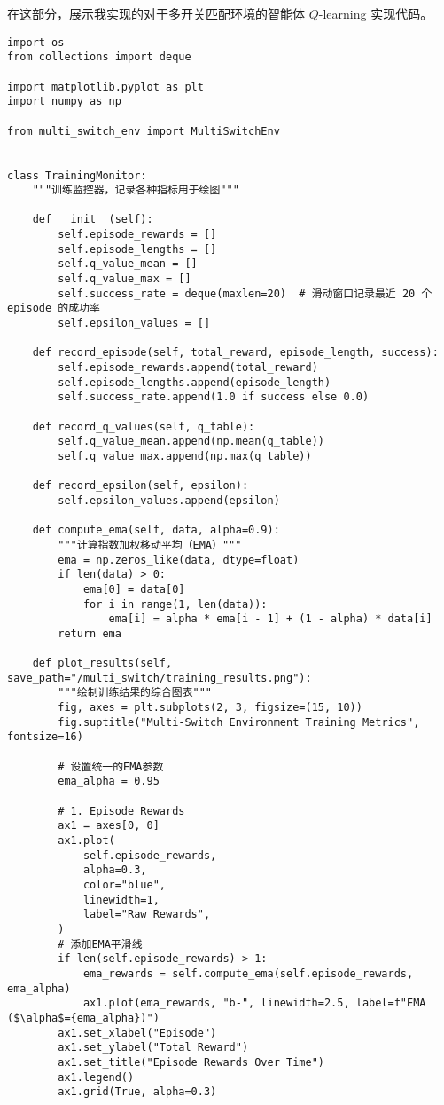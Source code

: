 在这部分，展示我实现的对于多开关匹配环境的智能体 \(Q\)-learning 实现代码。

\begin{verbatim}
import os
from collections import deque

import matplotlib.pyplot as plt
import numpy as np

from multi_switch_env import MultiSwitchEnv


class TrainingMonitor:
    """训练监控器，记录各种指标用于绘图"""

    def __init__(self):
        self.episode_rewards = []
        self.episode_lengths = []
        self.q_value_mean = []
        self.q_value_max = []
        self.success_rate = deque(maxlen=20)  # 滑动窗口记录最近 20 个 episode 的成功率
        self.epsilon_values = []

    def record_episode(self, total_reward, episode_length, success):
        self.episode_rewards.append(total_reward)
        self.episode_lengths.append(episode_length)
        self.success_rate.append(1.0 if success else 0.0)

    def record_q_values(self, q_table):
        self.q_value_mean.append(np.mean(q_table))
        self.q_value_max.append(np.max(q_table))

    def record_epsilon(self, epsilon):
        self.epsilon_values.append(epsilon)

    def compute_ema(self, data, alpha=0.9):
        """计算指数加权移动平均（EMA）"""
        ema = np.zeros_like(data, dtype=float)
        if len(data) > 0:
            ema[0] = data[0]
            for i in range(1, len(data)):
                ema[i] = alpha * ema[i - 1] + (1 - alpha) * data[i]
        return ema

    def plot_results(self, save_path="/multi_switch/training_results.png"):
        """绘制训练结果的综合图表"""
        fig, axes = plt.subplots(2, 3, figsize=(15, 10))
        fig.suptitle("Multi-Switch Environment Training Metrics", fontsize=16)

        # 设置统一的EMA参数
        ema_alpha = 0.95

        # 1. Episode Rewards
        ax1 = axes[0, 0]
        ax1.plot(
            self.episode_rewards,
            alpha=0.3,
            color="blue",
            linewidth=1,
            label="Raw Rewards",
        )
        # 添加EMA平滑线
        if len(self.episode_rewards) > 1:
            ema_rewards = self.compute_ema(self.episode_rewards, ema_alpha)
            ax1.plot(ema_rewards, "b-", linewidth=2.5, label=f"EMA ($\alpha$={ema_alpha})")
        ax1.set_xlabel("Episode")
        ax1.set_ylabel("Total Reward")
        ax1.set_title("Episode Rewards Over Time")
        ax1.legend()
        ax1.grid(True, alpha=0.3)


\end{verbatim}
